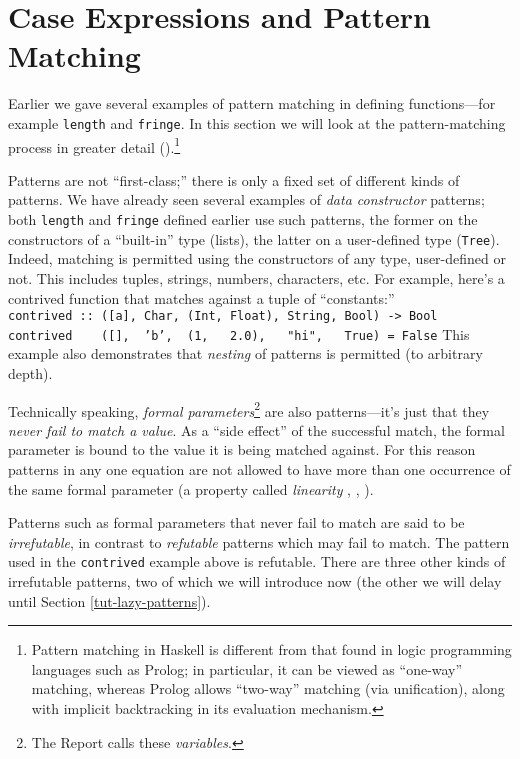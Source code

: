 
\section{Case Expressions and Pattern Matching}
\label{tut-pattern-matching}

Earlier we gave several examples of pattern matching in defining
functions---for example \mbox{\tt length} and \mbox{\tt fringe}.  In this section we
will look at the pattern-matching process in greater detail
().\footnote{Pattern matching in Haskell is 
different from that found in logic programming languages such as
Prolog; in particular, it can be viewed as ``one-way'' matching,
whereas Prolog allows ``two-way'' matching (via unification), along
with implicit backtracking in its evaluation mechanism.}

Patterns are not ``first-class;'' there is only a fixed set of
different kinds of patterns.  We have already seen several examples of
{\em data constructor} patterns; both \mbox{\tt length} and \mbox{\tt fringe} defined
earlier use such patterns, the former on the constructors of a
``built-in'' type (lists), the latter on a user-defined type (\mbox{\tt Tree}).
Indeed, matching is permitted using the constructors of any type,
user-defined or not.  This includes tuples, strings, numbers,
characters, etc.  For example, here's a contrived function that
matches against a tuple of ``constants:''
\bprog
\mbox{\tt contrived\ ::\ ([a],\ Char,\ (Int,\ Float),\ String,\ Bool)\ ->\ Bool}\\
\mbox{\tt contrived\ \ \ \ ([],\ \ 'b',\ \ (1,\ \ \ 2.0),\ \ \ "hi",\ \ \ True)\ =\ False}
\eprog 
This example also demonstrates that {\em nesting} of patterns is
permitted (to arbitrary depth).

Technically speaking, {\em formal parameters}\footnote{The Report
calls these {\em variables}.} are also patterns---it's just that they
{\em never fail to match a value}.  As a ``side effect'' of the
successful match, the formal parameter is bound to the value it is
being matched against.  For this reason patterns in any one equation
are not allowed to have more than one occurrence of the same formal
parameter (a property called {\em linearity} ,
, ).

Patterns such as formal parameters that never fail to match are said
to be {\em irrefutable}, in contrast to {\em refutable} patterns which
may fail to match.  The pattern used
in the \mbox{\tt contrived} example above is refutable.  There are three
other kinds of irrefutable patterns, two of which we will introduce
now (the other we will delay until Section \ref{tut-lazy-patterns}).

